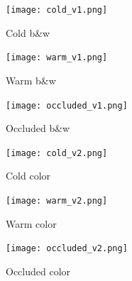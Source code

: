 \documentclass{article}
\begin{document}
\begin{figure}[!htb]
  \begin{minipage}{0.32\textwidth}
    \centering
    \texttt{[image: cold\_v1.png]}
    \caption{Cold b\&w}\label{Fig:ColdV1}
  \end{minipage}
  \begin{minipage}{0.35\textwidth}
    \centering
    \texttt{[image: warm\_v1.png]}
    \caption{Warm b\&w}\label{Fig:WarmV1}
  \end{minipage}
  \begin{minipage}{0.32\textwidth}
    \centering
    \texttt{[image: occluded\_v1.png]}
    \caption{Occluded b\&w}\label{Fig:OccludedV1}
  \end{minipage}
\end{figure}

\begin{figure}[!htb]
  \begin{minipage}{0.32\textwidth}
    \centering
    \texttt{[image: cold\_v2.png]}
    \caption{Cold color}\label{Fig:ColdV1}
  \end{minipage}
  \begin{minipage}{0.35\textwidth}
    \centering
    \texttt{[image: warm\_v2.png]}
    \caption{Warm color}\label{Fig:WarmV1}
  \end{minipage}
  \begin{minipage}{0.32\textwidth}
    \centering
    \texttt{[image: occluded\_v2.png]}
    \caption{Occluded color}\label{Fig:OccludedV1}
  \end{minipage}
\end{figure}

\newpage
\end{document}
